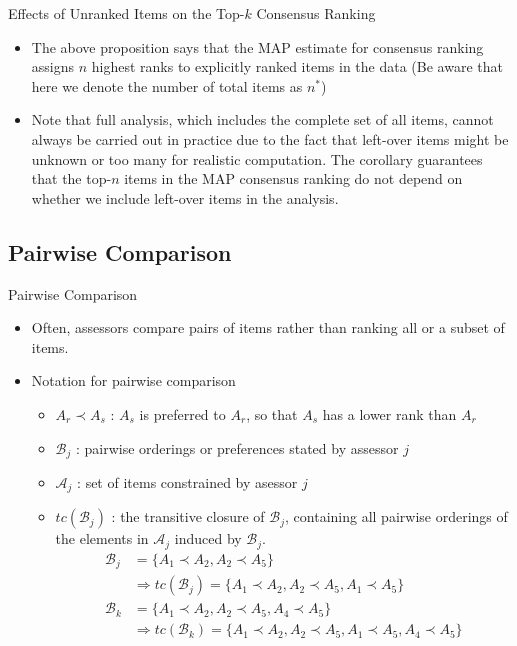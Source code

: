 \documentclass[11pt]{beamer}
\begin{document}
\begin{frame}{Effects of Unranked Items on the Top-$k$ Consensus Ranking}
\begin{itemize}
    \item The above proposition says that the MAP estimate for consensus ranking assigns $n$ highest ranks to explicitly ranked items in the data (Be aware that here we denote the number of total items as $n^*$)
    \item Note that full analysis, which includes the complete set of all  items, cannot always be carried out in practice due to the fact that left-over items might be unknown or too many for realistic computation. The corollary guarantees that the top-$n$ items in the MAP consensus ranking do not depend on whether we include left-over items in the analysis. 
\end{itemize}
\end{frame}

\subsection{Pairwise Comparison}
\begin{frame}{Pairwise Comparison}
\begin{itemize}
    \item Often, assessors compare pairs of items rather than ranking all or a subset of items. 
    \item Notation for pairwise comparison 
    \begin{itemize}
        \item $A_r\prec A_s$ : $A_s$ is preferred to $A_r$, so that $A_s$ has a lower rank than $A_r$ 
        \item $\mathcal{B}_j$ : pairwise orderings or preferences stated by assessor $j$
        \item $\mathcal{A}_j$ : set of items constrained by asessor $j$
        \item $tc(\mathcal{B}_j)$ : the transitive closure of $\mathcal{B}_j$, containing all pairwise orderings of the elements in $\mathcal{A}_j$ induced by $\mathcal{B}_j$.
        \begin{align*}
            \mathcal{B}_j&=\{A_1\prec A_2, A_2\prec A_5\} \\ &\Rightarrow tc(\mathcal{B}_j)=\{A_1\prec A_2, A_2\prec A_5, A_1\prec A_5\} \\\mathcal{B}_k &=\{A_1\prec A_2, A_2\prec A_5, A_4\prec A_5\} \\ &\Rightarrow tc(\mathcal{B}_k)=\{A_1\prec A_2, A_2\prec A_5, A_1\prec A_5, A_4\prec A_5\}
        \end{align*}
    \end{itemize} 
\end{itemize}
\end{frame}
\end{document}
